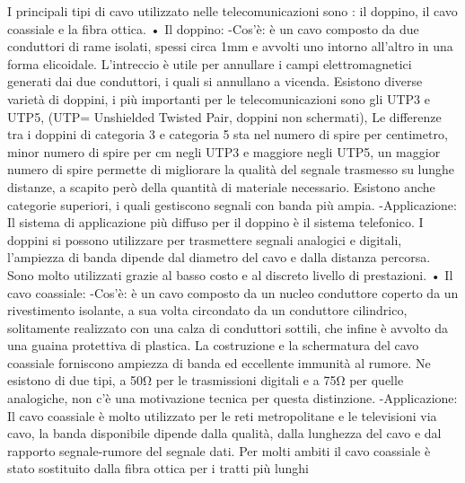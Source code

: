 I principali tipi di cavo utilizzato nelle telecomunicazioni sono : il doppino, il cavo coassiale e la fibra ottica.
•	Il doppino:
-Cos’è: è un cavo composto da due conduttori di rame isolati, spessi circa 1mm e avvolti uno intorno all’altro in una forma elicoidale. L’intreccio è utile per annullare i campi elettromagnetici generati dai due conduttori, i quali si annullano a vicenda. Esistono diverse varietà di doppini, i più importanti per le telecomunicazioni sono gli UTP3 e UTP5, (UTP= Unshielded Twisted Pair, doppini non schermati), Le differenze tra i doppini di categoria 3 e categoria 5 sta nel numero di spire per centimetro, minor numero di spire per cm negli UTP3 e maggiore negli UTP5, un maggior numero di spire permette di migliorare la qualità del segnale trasmesso su lunghe distanze, a scapito però della quantità di materiale necessario. Esistono anche categorie superiori, i quali gestiscono segnali con banda più ampia.  
-Applicazione: Il sistema di applicazione più diffuso per il doppino è il sistema telefonico. I doppini si 	possono utilizzare per trasmettere segnali analogici e digitali, l’ampiezza di banda dipende dal diametro del cavo e dalla distanza percorsa. Sono molto utilizzati grazie al basso costo e al discreto livello di prestazioni.
•	Il cavo coassiale:
-Cos’è: è un cavo composto da un nucleo conduttore coperto da un rivestimento isolante, a sua volta circondato da un conduttore cilindrico, solitamente realizzato con una calza di conduttori sottili, che infine è avvolto da una guaina protettiva di plastica. La costruzione e la schermatura del cavo coassiale forniscono ampiezza di banda ed eccellente immunità al rumore. Ne esistono di due tipi, a 50Ω per le trasmissioni digitali e a 75Ω per quelle analogiche, non c’è una motivazione tecnica per questa distinzione.
-Applicazione: Il cavo coassiale è molto utilizzato per le reti metropolitane e le televisioni via cavo, la banda disponibile dipende dalla qualità, dalla lunghezza del cavo e dal rapporto segnale-rumore del segnale dati. Per molti ambiti il cavo coassiale è stato sostituito dalla fibra ottica per i tratti più lunghi
 
